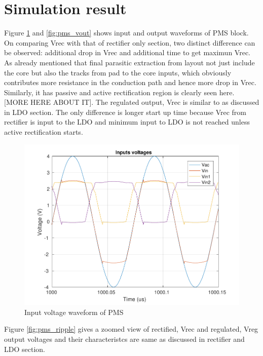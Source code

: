 \documentclass[12pt,a4paper,UKenglish]{article}
\begin{document}
\section{Simulation result}

Figure \ref{fig:pms_vin} and \ref{fig:pms_vout} shows input and output waveforms of PMS block. On comparing Vrec with that of rectifier only section, two distinct difference can be observed: additional drop in Vrec and additional time to get maximun Vrec. As already mentioned that final parasitic extraction from layout not just include the core but also the tracks from pad to the core inputs, which obviously contributes more resistance in the conduction path and hence more drop in Vrec. Similarly, it has passive and active rectification region is clearly seen here. [MORE HERE ABOUT IT]. The regulated output, Vrec is similar to as discussed in LDO section. The only difference is longer start up time because Vrec from rectifier is input to the LDO and minimum input to LDO is not reached unless active rectification starts.\\

\begin{figure} [H]
  \centering
  \includegraphics[width=\textwidth]{img/pms/pms_Vs.pdf} 
 \caption{Input voltage waveform of PMS} 
\label{fig:pms_vin} 
\end{figure}

Figure \ref{fig:pms_ripple} gives a zoomed view of rectified, Vrec and regulated, Vreg output voltages and their characteristcs are same as discussed in rectifier and LDO section.
\end{document}
